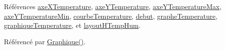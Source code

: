 Références \hyperlink{class_graphique_a83ef0cdf381f66a6202022b8545bfb1c}{axe\+X\+Temperature}, \hyperlink{class_graphique_a3df7eeca8d7dba5f528f65d89883736f}{axe\+Y\+Temperature}, \hyperlink{class_graphique_a6aac1bb5ad9a78cb91ca64359e7da307}{axe\+Y\+Temperature\+Max}, \hyperlink{class_graphique_ad0971f340d49a40c14376a0e0a985f81}{axe\+Y\+Temperature\+Min}, \hyperlink{class_graphique_a6c2f8ef3364123ad300de74db529bd9b}{courbe\+Temperature}, \hyperlink{class_graphique_a468d57ae7b14b46558cf25629cced7b6}{debut}, \hyperlink{class_graphique_ad2fe81a972ee10a20a56300a87a78f24}{graphe\+Temperature}, \hyperlink{class_graphique_a485cc4a65014e812b9e4aa9ee3ea9ca4}{graphique\+Temperature}, et \hyperlink{class_graphique_a1ccd9268372eef81a117bd82b50bec6a}{layout\+H\+Temp\+Hum}.



Référencé par \hyperlink{class_graphique_a3aec0a5aaae78f0726771dea67af69b4}{Graphique()}.


